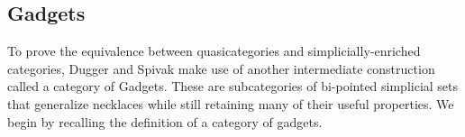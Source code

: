 \documentclass[leqno]{article}
\numberwithin{equation}{subsection}
\theoremstyle{plain}   %
\newtheorem{thm}[equation]{Theorem}
\theoremstyle{remark}
\theoremstyle{plain}
\newcommand{\Nec}{\ensuremath{{\mathcal{N}ec}}}
\newcommand{\Hoc}{\ensuremath{{\mathcal{H}oc}}}
\newcommand{\overcat}[2]{{\left(#1\downarrow #2\right)}}
\DeclareMathOperator{\pt}{pt}
\begin{document}
\begin{comment}
	In the case of \(\mathfrak{C}^\Hoc\), we can see immediately that there is a unique natural transformation \[\mathcal{E}_{X,c}	(x,y)\to \pt,\] and this induces a map on homotopy colimits.  Moreover, since \(\mathcal{E}_{X,c}(x,y)(T)=\mathfrak{C}_\Delta	(\pi(T))(\alpha,\omega)\) and since \(\pi(T)\) is a simplicial necklace,  \(\mathfrak{C}_\Delta(\pi(T))(\alpha,\omega)\) is 	weakly contractible. Therefore, the induced map on homotopy-colimits is a weak equivalence of simplicial sets.  This shows 	that the natural map \[\mathfrak{C}^\Hoc \to \mathfrak{C}^\Nec\] is a weak equivalence.

	Then we need to show that \(E_{X,c}\) is a homotopy colimit:
	\begin{thm}\label{necthm}
		The natural map \[\mathfrak{C}^\Hoc_c \to \mathfrak{C}_c\] is a pointwise weak equivalence.
	\end{thm}
	\begin{proof}
		See \cite{ds1}*{4.4, 4.10, 5.2}.  Their proof works exactly the same way as in our case.  What they show is that the \	(\ell^\mathrm{th}\) row of the bisimplicial set of pairs 
		\[(\sigma:[n]\to \overcat{\Nec_c^\mathbf{sp}}{X_{x,y}}; \zeta \in \mathfrak{C}_\Delta(\pi\sigma(0))_\ell)\]
		is homotopy-discrete, which means that the homotopy and ordinary colimit agree.  Our indexing category is just a disjoint 	union of copies of their indexing category, so if theirs is homotopy-discrete, so is ours.
	\end{proof}
\end{comment}

\subsection{Gadgets}
To prove the equivalence between quasicategories and simplicially-enriched categories, Dugger and Spivak make use of another intermediate construction called a category of Gadgets.  These are subcategories of bi-pointed simplicial sets that generalize necklaces while still retaining many of their useful properties. We begin by recalling the definition of a category of gadgets.
\end{document}
